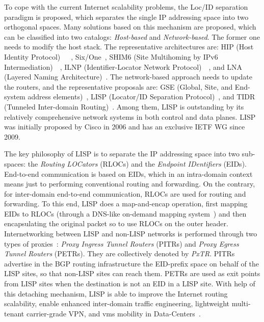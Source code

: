 To cope with the current Internet scalability problems, the Loc/ID separation paradigm is proposed, which separates the single IP addressing space into two orthogonal spaces. Many solutions based on this mechanism are proposed, which can be classified into two catalogs: \emph{Host-based} and \emph{Network-based}. The former one needs to modify the host stack. The representative architectures are: HIP (Host Identity Protocol)~\cite{nikander2010host}~\cite{Moskowitz2017host}~\cite{moskowitz2015host}, Six/One~\cite{vogt2007six}, SHIM6 (Site Multihoming by IPv6 Intermediation)~\cite{garcia2010shim6}~\cite{nordmark2009shim6}, ILNP (Identifier-Locator Network Protocol)~\cite{bhatti2012identifier}~\cite{atkinson2010evolving}, and LNA (Layered Naming Architecture)~\cite{balakrishnan2004layered}. The network-based approach needs to update the routers, and the representative proposals are: GSE (Global, Site, and End-system address elements)~\cite{o2006gse}, LISP (Locator/ID Separation Protocol)~\cite{rfc6830}, and TIDR (Tunneled Inter-domain Routing)~\cite{adan2006tunneled}. Among them, LISP is outstanding by its relatively comprehensive network systems in both control and data planes. %
LISP was initially proposed by Cisco in 2006 and has an exclusive IETF WG since 2009. %

The key philosophy of LISP is to separate the IP addressing space into two sub-spaces: the \emph{Routing LOCators} (RLOCs) and the \emph{Endpoint IDentifiers} (EIDs). End-to-end communication is based on EIDs, which in an intra-domain context means just to performing conventional routing and forwarding. On the contrary, for inter-domain end-to-end communication, RLOCs are used for routing and forwarding. To this end, LISP does a map-and-encap operation, first mapping EIDs to RLOCs (through a DNS-like on-demand mapping system~\cite{lispALTPourri}) and then encapsulating the original packet so to use RLOCs on the outer header. Internetworking between LISP and non-LISP networks is performed through two types of proxies~\cite{rfc6832}: \emph{Proxy Ingress Tunnel Routers} (PITRs) and \emph{Proxy Egress Tunnel Routers} (PETRs). They are collectively denoted by \emph{PxTR}. PITRs advertise in the BGP  routing infrastructure the EID-prefix space on behalf of the LISP sites, so that non-LISP sites can reach them. %
PETRs are used as exit points from LISP sites when the destination is not an EID in a LISP site. %
With help of this detaching mechanism, LISP is able to improve the Internet routing scalability, enable enhanced inter-domain traffic engineering, lightweight multi-tenant carrier-grade VPN, and \acrshort{vm}s mobility in Data-Centers~\cite{saucez2012designing}.

